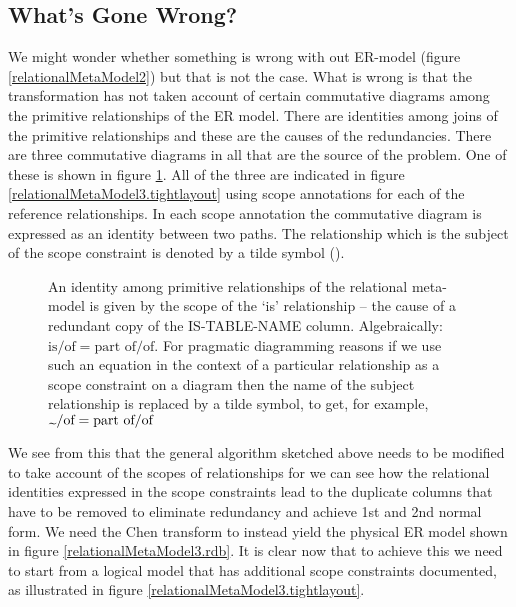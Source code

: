 \documentclass[10pt,a4paper]{article}
\begin{document}
\subsection{What's Gone Wrong?}
We might wonder whether something is wrong with out ER-model 
(figure \ref{relationalMetaModel2}) but that is not the case.  What is wrong is that 
the transformation has not taken account of certain commutative diagrams  among the primitive relationships of the ER model. There are identities among joins of the primitive relationships and these are the causes of the redundancies. 
There are three commutative diagrams in all that are the source of the problem. One of these is shown in  figure
\ref{relationalMetaModelIdentities}. All of the three are indicated in figure \ref{relationalMetaModel3.tightlayout} using 
scope annotations for each of the reference relationships. In each scope annotation the commutative diagram is expressed as an identity 
between two paths. The relationship which is the subject of the scope constraint is denoted by a tilde symbol (\texttildelow).

\begin{figure}[h]
\begin{center}
 
\end{center}
\caption{An identity among primitive relationships of the relational meta-model is given
by the scope of the `is' relationship -- the cause of a redundant copy of the IS-TABLE-NAME column. Algebraically: $\text{is}/\text{of}=\text{part of}/\text{of}$. For pragmatic diagramming reasons if we use such an equation in the context of a particular relationship as a scope
constraint on a diagram then the name of the subject relationship is replaced by a tilde symbol, to get, for example, 
$\text{\texttildelow}/\text{of}=\text{part of}/\text{of}$
}
\label{relationalMetaModelIdentities}
\end{figure}

\noindent We see from this that the general algorithm sketched above  needs to be modified to take account of the scopes of relationships for we can see how the relational identities expressed in the scope constraints lead to the duplicate columns that have to be removed to eliminate redundancy and achieve 1st and 2nd normal form. 
\noindent We need the Chen transform to instead yield the physical ER model shown in figure \ref{relationalMetaModel3.rdb}.  It is clear now that to achieve this we need to start from a logical model that has additional scope constraints documented, as illustrated in figure \ref{relationalMetaModel3.tightlayout}.
\end{document}
